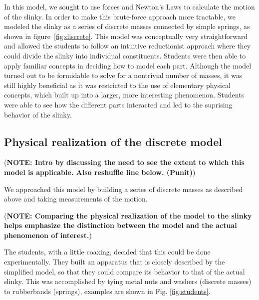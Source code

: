 \documentclass[prb,preprint,superscriptaddress]{revtex4-1}
\newcommand{\NOTE}[1]{\marginpar{\footnotesize\textbf{NOTE}} (\textbf{NOTE: #1})}
\newcommand{\subsec}[1]{section~\ref{subsec:#1}}
\newcommand{\fig}[1]{figure~\ref{fig:#1}}
\begin{document}
In this model, we sought to use forces and Newton's Laws to calculate the
motion of the slinky. In order to make this brute-force approach more tractable, we
modeled the slinky as a series of discrete masses connected by simple springs, as
shown in \fig{discrete}. This
model was conceptually very straightforward and allowed the students to follow an
intuitive reductionist approach where they could divide the slinky into individual
constituents. Students were then able to apply familiar concepts in deciding how to model each part. Although the model turned out to
be formidable to solve for a nontrivial number of masses, it was still highly beneficial as it was restricted to the
use of elementary physical concepts, which built up into a larger, more interesting
phenomenon. Students were able to see how the different parts interacted and led
to the suprising behavior of the slinky.



\subsection{Physical realization of the discrete model}
\label{subsec:forcesexperiment}

\NOTE{Intro by discussing the need to see the extent to which this model
is applicable. Also reshuffle line below. (Punit)}

We approached this model
by building a series of discrete masses as described above and taking measurements of
the motion.

\NOTE{Comparing the physical realization of the model to the slinky 
helps emphasize the distinction between the model and the actual phenomenon of interest.}


The students, with a little coaxing, decided that this could be done experimentally.  They built an 
apparatus that is closely described by the simplified model, so that they could compare its behavior to that of the 
actual slinky.  This was accomplished by tying metal nuts and washers (discrete masses) to 
rubberbands (springs), examples are shown in Fig. \ref{fig:students}.  
\end{document}
